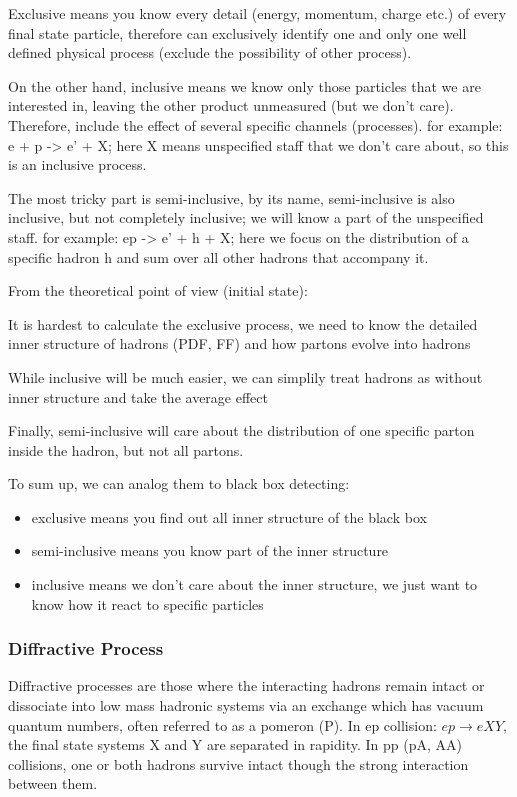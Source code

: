 Exclusive means you know every detail (energy, momentum, charge etc.) of every 
final state particle, therefore can exclusively identify one and only one 
well defined physical process (exclude the possibility of other process).

On the other hand, inclusive means we know only those particles that we are
interested in, leaving the other product unmeasured (but we don't care). 
Therefore, include the effect of several specific channels (processes).
for example: e + p -> e' + X; here X means unspecified staff that we don't care about,
so this is an inclusive process.

The most tricky part is semi-inclusive, by its name, semi-inclusive is also
inclusive, but not completely inclusive; we will know a part of the unspecified
staff. for example: ep -> e' + h + X; here we focus on the distribution of a
specific hadron h and sum over all other hadrons that accompany it.



From the theoretical point of view (initial state):

It is hardest to calculate the exclusive process, we need to know the detailed
inner structure of hadrons (PDF, FF) and how partons evolve into hadrons

While inclusive will be much easier, we can simplily treat hadrons as without
inner structure and take the average effect

Finally, semi-inclusive will care about the distribution of one specific parton
inside the hadron, but not all partons.


To sum up, we can analog them to black box detecting:
\begin{itemize}
    \item exclusive means you find out all inner structure of the black box
    \item semi-inclusive means you know part of the inner structure
    \item inclusive means we don't care about the inner structure, we just want
	to know how it react to specific particles
\end{itemize}

\subsubsection{Diffractive Process}
Diffractive processes are those where the interacting hadrons remain intact or 
dissociate into low mass hadronic systems via an exchange which has vacuum 
quantum numbers, often referred to as a pomeron (P).
In ep collision: $ep \rightarrow eXY$, the final state systems X and Y are 
separated in rapidity. In pp (pA, AA) collisions, one or both hadrons survive 
intact though the strong interaction between them.


